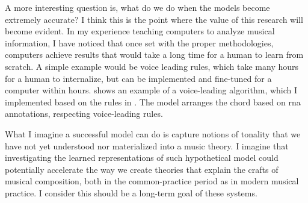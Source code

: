 

A more interesting question is, what do we do when the
models become extremely accurate? I think this is the point
where the value of this research will become evident. In my
experience teaching computers to analyze musical
information, I have noticed that once set with the proper
methodologies, computers achieve results that would take a
long time for a human to learn from scratch. A simple
example would be voice leading rules, which take many hours
for a human to internalize, but can be implemented and
fine-tuned for a computer within hours.
 shows an example of a
voice-leading algorithm, which I implemented based on the
rules in \textcite{huron2016voice}. The model arranges the
chord based on \gls{rna} annotations, respecting
voice-leading rules. 


What I imagine a successful model can do is capture notions
of tonality that we have not yet understood nor materialized
into a music theory. I imagine that investigating the
learned representations of such hypothetical model could
potentially accelerate the way we create theories that
explain the crafts of musical composition, both in the
common-practice period as in modern musical practice. I
consider this should be a long-term goal of these systems.
